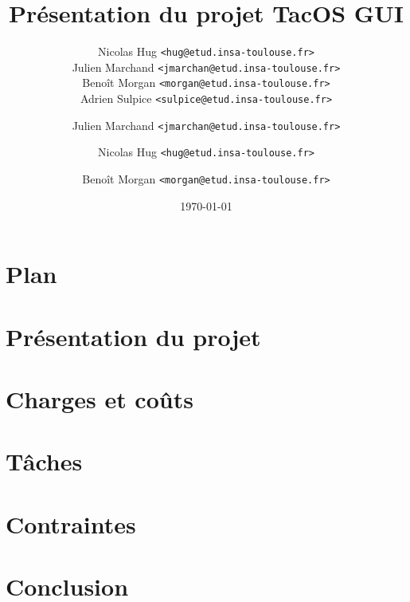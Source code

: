 \documentclass[xcolor=table,12pt]{beamer}
\title{Présentation du projet TacOS GUI}
\author[TacOS GUI Team (hug, jmarchan, morgan, sulpice)]{Nicolas Hug \texttt{<hug@etud.insa-toulouse.fr>}\\
Julien Marchand \texttt{<jmarchan@etud.insa-toulouse.fr>}\\
Benoît Morgan \texttt{<morgan@etud.insa-toulouse.fr>}\\
Adrien Sulpice \texttt{<sulpice@etud.insa-toulouse.fr>}}
\institute{INSA de Toulouse}
\date{\today}
\begin{document}

\frame{\titlepage}

\section[Plan]{Plan}
\frame{\tableofcontents}

\section{Présentation du projet}

\author{Julien Marchand \texttt{<jmarchan@etud.insa-toulouse.fr>}}
\section{Charges et coûts}

\author{Nicolas Hug \texttt{<hug@etud.insa-toulouse.fr>}}
\section{Tâches}

\author{Benoît Morgan \texttt{<morgan@etud.insa-toulouse.fr>}}
\section{Contraintes}

\section{Conclusion}

\end{document}
